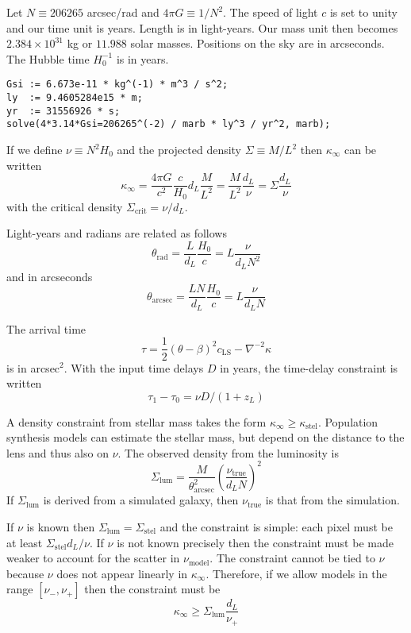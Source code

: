 \documentclass{article}
\begin{document}
\noindent[10-JAN-2011]\bigskip

Let $N \equiv 206265$ arcsec/rad and $4\pi G \equiv 1/N^2$. The speed of 
light $c$ is set to unity and our time unit is years. Length is in light-years.
Our mass unit then becomes $2.384\times 10^{31}$ kg or $11.988$ solar masses.
Positions on the sky are in arcseconds.  The Hubble time $H_0^{-1}$ is in
years.

\begin{verbatim}
Gsi := 6.673e-11 * kg^(-1) * m^3 / s^2;
ly  := 9.4605284e15 * m;
yr  := 31556926 * s;
solve(4*3.14*Gsi=206265^(-2) / marb * ly^3 / yr^2, marb);
\end{verbatim}

If we define $\nu \equiv N^2 H_0$ and the projected density $\Sigma \equiv M/L^2$ 
then $\kappa_\infty$ can be written 
\[\kappa_\infty = \frac{4\pi G}{c^2}\frac{c}{H_0}d_L\frac{M}{L^2} 
                = \frac{M}{L^2}\frac{d_L}{\nu}
                = \Sigma\frac{d_L}{\nu} \]
with the critical density $\Sigma_\mathrm{crit} = \nu/d_L$.

Light-years and radians are related as follows
\[\theta_\mathrm{rad} = \frac{L}{d_L}\frac{H_0}{c} = L\frac{\nu}{d_L N^2}\]
and in arcseconds 
\[\theta_\mathrm{arcsec} = \frac{L N}{d_L}\frac{H_0}{c} = L\frac{\nu}{d_L N}\]

The arrival time
\[\tau = \frac12(\theta-\beta)^2 c_\mathrm{LS} - \nabla^{-2}\kappa\]
is in arcsec$^2$. With the input time delays $D$ in years,
the time-delay constraint is written
\[\tau_1 - \tau_0 = \nu D / (1+z_L)\]

A density constraint from stellar mass takes the form $\kappa_\infty \geq \kappa_\mathrm{stel}$.
Population synthesis models can estimate the stellar mass, but depend on the distance to the lens
and thus also on $\nu$. The observed density from the luminosity is
\[\Sigma_\mathrm{lum} = \frac{M}{\theta^2_\mathrm{arcsec}}\left(\frac{\nu_\mathrm{true}}{d_L N}\right)^2\]
If $\Sigma_\mathrm{lum}$ is derived from a simulated galaxy, then $\nu_\mathrm{true}$ is that from the
simulation.

If $\nu$ is known then $\Sigma_\mathrm{lum} = \Sigma_\mathrm{stel}$ and the
constraint is simple: each pixel must be at least $\Sigma_\mathrm{stel} d_L /
\nu$. If $\nu$ is not known precisely then the constraint must be made weaker
to account for the scatter in $\nu_\mathrm{model}$. The constraint cannot be
tied to $\nu$ because $\nu$ does not appear linearly in $\kappa_\infty$.
Therefore, if we allow models in the range $[\nu_-, \nu_+]$ then the constraint
must be \[\kappa_\infty \geq \Sigma_\mathrm{lum}\frac{d_L}{\nu_+}\]
\end{document}
